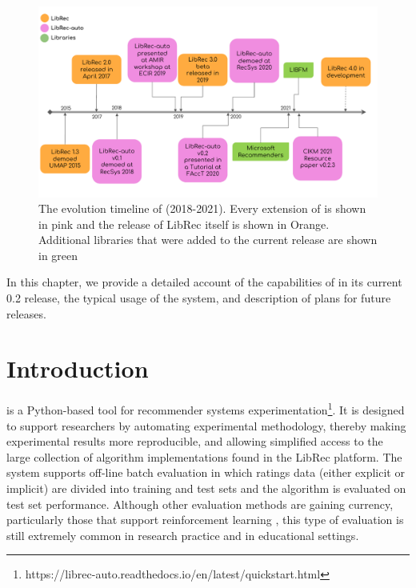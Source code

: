 \begin{figure}[ht!]
    \centering
    \includegraphics[width=0.95\linewidth]{figs/chapter6-librecauto/librec-auto-revolution.pdf}
    \caption{The evolution timeline of \libauto{} (2018-2021). Every extension of \libauto{} is shown in pink and the release of LibRec itself is shown in Orange. Additional libraries that were added to the current release are shown in green}
    \label{fig:librec-auto-evolution}
    \vspace{-0.15in}
\end{figure}



In this chapter, we provide a detailed account of the capabilities of \libauto{} in its current 0.2 release, the typical usage of the system, and description of plans for future releases.


\section{Introduction}
\label{sec:librec_intro}

\libauto{} is a Python-based tool for recommender systems experimentation\footnote{https://librec-auto.readthedocs.io/en/latest/quickstart.html}. It is designed to support researchers by automating experimental methodology, thereby making experimental results more reproducible, and allowing simplified access to the large collection of algorithm implementations found in the LibRec platform. The system supports off-line batch evaluation in which ratings data (either explicit or implicit) are divided into training and test sets and the algorithm is evaluated on test set performance. Although other evaluation methods are gaining currency, particularly those that support reinforcement learning \cite{joachims2018reveal,joachims2019reveal,joachims2020reveal}, this type of evaluation is still extremely common in research practice and in educational settings. 

